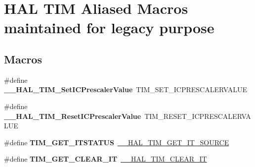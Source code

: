 \hypertarget{group___h_a_l___t_i_m___aliased___macros}{}\section{H\+AL T\+IM Aliased Macros maintained for legacy purpose}
\label{group___h_a_l___t_i_m___aliased___macros}
\subsection*{Macros}
\begin{DoxyCompactItemize}
\item 
\mbox{\label{group___h_a_l___t_i_m___aliased___macros_ga1f487f25516b3fd87b864f5be8229b7e}} 
\#define {\bfseries \+\_\+\+\_\+\+H\+A\+L\+\_\+\+T\+I\+M\+\_\+\+Set\+I\+C\+Prescaler\+Value}~T\+I\+M\+\_\+\+S\+E\+T\+\_\+\+I\+C\+P\+R\+E\+S\+C\+A\+L\+E\+R\+V\+A\+L\+UE
\item 
\mbox{\label{group___h_a_l___t_i_m___aliased___macros_gac171a25ce55eafe62671d40d7397d721}} 
\#define {\bfseries \+\_\+\+\_\+\+H\+A\+L\+\_\+\+T\+I\+M\+\_\+\+Reset\+I\+C\+Prescaler\+Value}~T\+I\+M\+\_\+\+R\+E\+S\+E\+T\+\_\+\+I\+C\+P\+R\+E\+S\+C\+A\+L\+E\+R\+V\+A\+L\+UE
\item 
\mbox{\label{group___h_a_l___t_i_m___aliased___macros_ga1dd7eae80b853d3526091193e81b4731}} 
\#define {\bfseries T\+I\+M\+\_\+\+G\+E\+T\+\_\+\+I\+T\+S\+T\+A\+T\+US}~\hyperlink{group___t_i_m___exported___macros_ga644babf93470a6eee6bce8906c4da5c5}{\+\_\+\+\_\+\+H\+A\+L\+\_\+\+T\+I\+M\+\_\+\+G\+E\+T\+\_\+\+I\+T\+\_\+\+S\+O\+U\+R\+CE}
\item 
\mbox{\label{group___h_a_l___t_i_m___aliased___macros_gadd580b2357a85c03653006349721a36e}} 
\#define {\bfseries T\+I\+M\+\_\+\+G\+E\+T\+\_\+\+C\+L\+E\+A\+R\+\_\+\+IT}~\hyperlink{group___t_i_m___exported___macros_gaea68155ce77e591e0c2582def061d6f0}{\+\_\+\+\_\+\+H\+A\+L\+\_\+\+T\+I\+M\+\_\+\+C\+L\+E\+A\+R\+\_\+\+IT}
\item 
\mbox{\label{group___h_a_l___t_i_m___aliased___macros_ga5b35f7cd15ac31c7b1a9596ac8521f36}} 

\end{DoxyCompactItemize}
